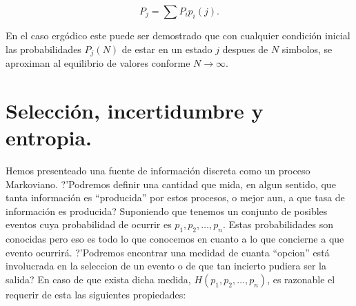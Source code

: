 \begin{equation}
P_{j} = \sum P_{i}p_{i}(j).
\end{equation}

En el caso erg\'{o}dico este puede ser demostrado que con cualquier condici\'{o}n inicial las
probabilidades $P_{j}(N)$ de estar en un estado $j$ despues de $N$ simbolos, se aproximan al
equilibrio de valores conforme $N \rightarrow \infty$.

\section{Selecci\'{o}n, incertidumbre y entropia.}

Hemos presenteado una fuente de informaci\'{o}n discreta como un proceso Markoviano. ?'Podremos
definir una cantidad que mida, en algun sentido, que tanta informaci\'{o}n es ``producida''
por estos procesos, o mejor aun, a que tasa de informaci\'{o}n es producida?
Suponiendo que tenemos un conjunto de posibles eventos cuya probabilidad de
ocurrir es $p_{1}, p_{2}, \ldots, p_{n}$. Estas probabilidades son conocidas pero eso
es todo lo que conocemos en cuanto a lo que concierne a que evento ocurrir\'{a}. ?'Podremos
encontrar una medidad de cuanta ``opcion'' est\'{a} involucrada en la seleccion de un evento
o de que tan incierto pudiera ser la salida?
En caso de que exista dicha medida, $H(p_{1}, p_{2}, \ldots, p_{n})$, es razonable el requerir
de esta las siguientes propiedades:

